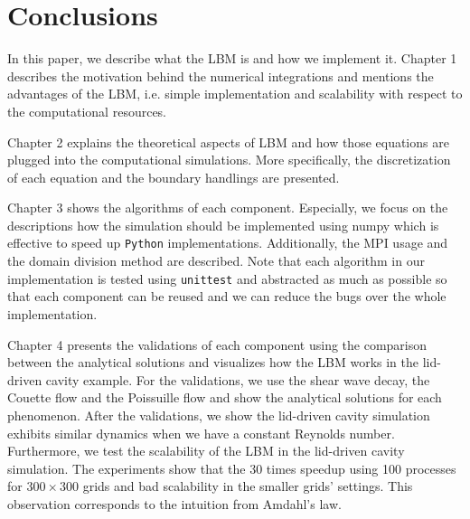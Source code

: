 \chapter{Conclusions}
In this paper, we describe what the LBM is
and how we implement it.
Chapter 1 describes the motivation behind the numerical integrations
and mentions the advantages of the LBM, i.e.
simple implementation and scalability with respect to the computational
resources.

Chapter 2 explains the theoretical aspects of LBM
and how those equations are plugged into the computational simulations.
More specifically, the discretization of each equation and
the boundary handlings are presented.

Chapter 3 shows the algorithms of each component.
Especially, we focus on the descriptions how
the simulation should be implemented using numpy
which is effective to speed up {\tt Python} implementations.
Additionally, the MPI usage and the domain division method
are described. 
Note that each algorithm in our implementation
is tested using {\tt unittest} and abstracted as much as possible
so that each component can be reused and we can reduce
the bugs over the whole implementation.

Chapter 4 presents the validations of each component
using the comparison between the analytical solutions
and visualizes how the LBM works in the lid-driven cavity
example.
For the validations, we use the shear wave decay, 
the Couette flow and the Poissuille flow
and show the analytical solutions for each phenomenon.
After the validations, we show the lid-driven cavity simulation
exhibits similar dynamics when we have a constant Reynolds number.
Furthermore, we test the scalability of the LBM in the lid-driven cavity simulation.
The experiments show that
the 30 times speedup using 100 processes for $300 \times 300$ grids
and bad scalability in the smaller grids' settings.
This observation corresponds to the intuition from Amdahl's law.
